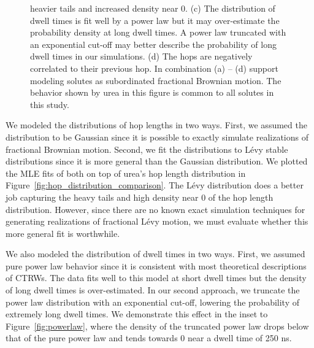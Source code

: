 \documentclass{article}
\begin{document}
\begin{figure}
{  heavier tails and increased density near 0. (c) The distribution of dwell times is fit
  well by a power law but it may over-estimate the probability density at long dwell times.
  A power law truncated with an exponential cut-off may better describe the probability of
  long dwell times in our simulations. (d) The hops are negatively correlated to their previous
  hop. In combination (a) -- (d) support modeling solutes as subordinated fractional Brownian
  motion. The behavior shown by urea in this figure is common to all solutes in this study.}\label{fig:anticorrelated_hops}
  \end{figure}
  
  We modeled the distributions of hop lengths in two ways. First, we assumed the 
  distribution to be Gaussian since it is possible to exactly simulate realizations of
  fractional Brownian motion. Second, we fit the distributions to L\'evy stable 
  distributions since it is more general than the Gaussian distribution. We plotted
  the MLE fits of both on top of urea's hop length distribution in 
  Figure~\ref{fig:hop_distribution_comparison}. The L\'evy distribution does a better
  job capturing the heavy tails and high density near 0 of the hop length distribution.
  However, since there are no known exact simulation techniques for generating 
  realizations of fractional L\'evy motion, we must evaluate whether this more general
  fit is worthwhile. 
  
  We also modeled the distribution of dwell times in two ways. First, we assumed pure
  power law behavior since it is consistent with most theoretical descriptions of CTRWs.
  The data fits well to this model at short dwell times but the density of long dwell
  times is over-estimated. In our second approach, we truncate the power law distribution
  with an exponential cut-off, lowering the probability of extremely long dwell times. 
  We demonstrate this effect in the inset to Figure~\ref{fig:powerlaw}, where the
  density of the truncated power law drops below that of the pure power law and tends towards
  0 near a dwell time of 250 ns.
  
\end{document}
